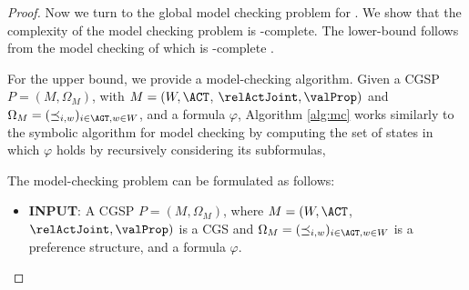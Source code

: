\begin{proof}

\iffalse
Given  a CGS $M  = ( W,  \ACT,  \relActJoint,  \valProp  )$
and a
goal base profile 
$\Gamma= (G_1, \ldots , G_n)$
with 
$G_i\subseteq
\mathcal{L}_{\mathsf{LTL}}$
for every agent $i\in \AGT$,
we can induce the corresponding CGS with stable preferences
$(M, \Omega_M^\Gamma)$
with $\Omega_M^\Gamma=(\preceq_{i,w }^\Gamma   )_{i \in \AGT, w \in W }$
as follows: 
\begin{itemize}
    \item for every $i\in \AGT$,
    for every $w \in W$
    \begin{align*}
            \preceq_{i,w }^\Gamma = &
    \Big\{ 
    (\lambda', \lambda) \in
    \historyset_{M} \times
    \historyset_{M} \suchthat  \\
&    \mathit{card}\big(
\{   \varphi \in G_i: (M,\lambda') \models \varphi\}
    \big) \geq
     \mathit{card}\big(
\{   \varphi \in G_i: (M,\lambda) \models \varphi\}
    \big)
    \Big\}.
    \end{align*} 
\end{itemize}
\fi

Now we turn to the global model checking problem for \atlratlogic. 
We show that the complexity of the model checking problem is \Ptime-complete. 
The lower-bound follows from the model
checking of  \atllogic which is \Ptime-complete \cite{alur2002alternating}. %

For the upper bound, we provide a model-checking algorithm. 
Given a CGSP $P = (M,\Omega_M)$, with   $M  = ( W,  \ACT$, $ \relActJoint, \allowbreak  \valProp  )$  and $\Omega_M=(\preceq_{i,w }   )_{i \in \AGT, w \in W }$, and a formula $\varphi$, Algorithm \ref{alg:mc} works similarly to the symbolic algorithm for \atllogic model checking \cite{alur2002alternating} by 
computing the set of states in which  $\varphi$ holds by recursively considering its subformulas,  

\iffalse
  The model-checking problem can be formulated as follows:
\begin{itemize}
    \item 
    \textbf{INPUT}:  
    A CGSP $P = (M,\Omega_M)$, where  $M  = ( W,  \ACT$, $ \relActJoint,  \valProp  )$ is a CGS and $\Omega_M=(\preceq_{i,w }   )_{i \in \AGT, w \in W }$ is a preference structure,  
    and a formula $\varphi$.


\end{itemize}
\end{proof}

